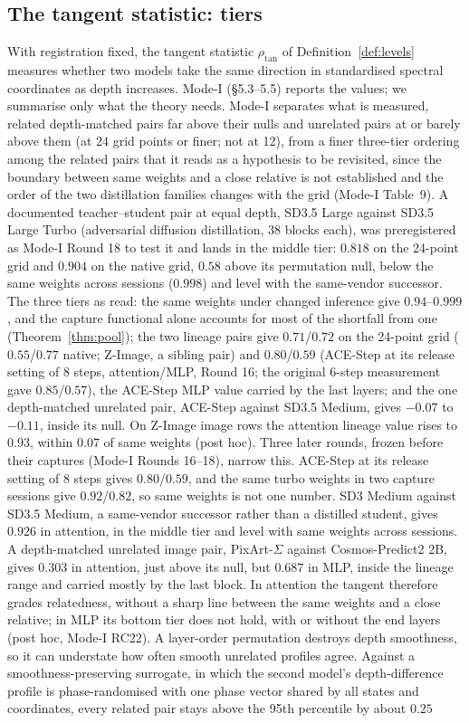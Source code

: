 \documentclass[11pt]{article}
\theoremstyle{definition}
\begin{document}
\subsection{The tangent statistic: tiers}
With registration fixed, the tangent statistic $\rho_{\mathrm{tan}}$ of Definition~\ref{def:levels} measures whether two models take the same direction in standardised spectral coordinates as depth increases. Mode-I (\S5.3--5.5) reports the values; we summarise only what the theory needs. Mode-I separates what is measured, related depth-matched pairs far above their nulls and unrelated pairs at or barely above them (at 24 grid points or finer; not at 12), from a finer three-tier ordering among the related pairs that it reads as a hypothesis to be revisited, since the boundary between same weights and a close relative is not established and the order of the two distillation families changes with the grid (Mode-I Table~9). A documented teacher--student pair at equal depth, SD3.5 Large against SD3.5 Large Turbo (adversarial diffusion distillation, 38 blocks each), was preregistered as Mode-I Round 18 to test it and lands in the middle tier: $0.818$ on the 24-point grid and $0.904$ on the native grid, $0.58$ above its permutation null, below the same weights across sessions ($0.998$) and level with the same-vendor successor. The three tiers as read: the same weights under changed inference give $0.94$--$0.999$, and the capture functional alone accounts for most of the shortfall from one (Theorem~\ref{thm:pool}); the two lineage pairs give $0.71$/$0.72$ on the 24-point grid ($0.55$/$0.77$ native; Z-Image, a sibling pair) and $0.80$/$0.59$ (ACE-Step at its release setting of 8 steps, attention/MLP, Round 16; the original 6-step measurement gave $0.85$/$0.57$), the ACE-Step MLP value carried by the last layers; and the one depth-matched unrelated pair, ACE-Step against SD3.5 Medium, gives $-0.07$ to $-0.11$, inside its null. On Z-Image image rows the attention lineage value rises to $0.93$, within $0.07$ of same weights (post hoc). Three later rounds, frozen before their captures (Mode-I Rounds 16--18), narrow this. ACE-Step at its release setting of 8 steps gives $0.80$/$0.59$, and the same turbo weights in two capture sessions give $0.92$/$0.82$, so same weights is not one number. SD3 Medium against SD3.5 Medium, a same-vendor successor rather than a distilled student, gives $0.926$ in attention, in the middle tier and level with same weights across sessions. A depth-matched unrelated image pair, PixArt-$\Sigma$ against Cosmos-Predict2 2B, gives $0.303$ in attention, just above its null, but $0.687$ in MLP, inside the lineage range and carried mostly by the last block. In attention the tangent therefore grades relatedness, without a sharp line between the same weights and a close relative; in MLP its bottom tier does not hold, with or without the end layers (post hoc, Mode-I RC22). A layer-order permutation destroys depth smoothness, so it can understate how often smooth unrelated profiles agree. Against a smoothness-preserving surrogate, in which the second model's depth-difference profile is phase-randomised with one phase vector shared by all states and coordinates, every related pair stays above the 95th percentile by about $0.25$ 
\end{document}
